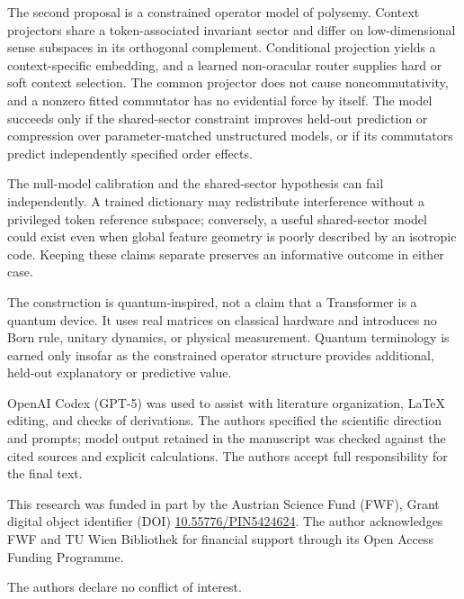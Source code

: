 \documentclass[
  aps,
  reprint,
  superscriptaddress,
  floatfix,
  nofootinbib,
  longbibliography
]{revtex4-2}
\begin{document}
The second proposal is a constrained operator model of polysemy.  Context
projectors share a token-associated invariant sector and differ on
low-dimensional sense subspaces in its orthogonal complement.  Conditional
projection yields a context-specific embedding, and a learned non-oracular
router supplies hard or soft context selection.  The common projector does not
cause noncommutativity, and a nonzero fitted commutator has no evidential force
by itself.  The model succeeds only if the shared-sector constraint improves
held-out prediction or compression over parameter-matched unstructured models,
or if its commutators predict independently specified order effects.

The null-model calibration and the shared-sector hypothesis can fail
independently.  A trained dictionary may redistribute interference without a
privileged token reference subspace; conversely, a useful shared-sector model
could exist even when global feature geometry is poorly described by an
isotropic code.  Keeping these claims separate preserves an informative
outcome in either case.

The construction is quantum-inspired, not a claim that a Transformer is a
quantum device.  It uses real matrices on classical hardware and introduces no
Born rule, unitary dynamics, or physical measurement.  Quantum terminology is
earned only insofar as the constrained operator structure provides additional,
held-out explanatory or predictive value.

\begin{acknowledgments}
OpenAI Codex (GPT-5) was used to assist with literature organization, \LaTeX{}
editing, and checks of derivations.  The authors specified the scientific
direction and prompts; model output retained in the manuscript was checked
against the cited sources and explicit calculations.  The authors accept full
responsibility for the final text.

This research was funded in part by the Austrian
Science Fund (FWF), Grant digital object identifier (DOI)
\href{https://doi.org/10.55776/PIN5424624}{10.55776/PIN5424624}.
The author acknowledges FWF and TU Wien Bibliothek for financial support through its
Open Access Funding Programme.

The authors declare no conflict of interest.
\end{acknowledgments}


\end{document}
